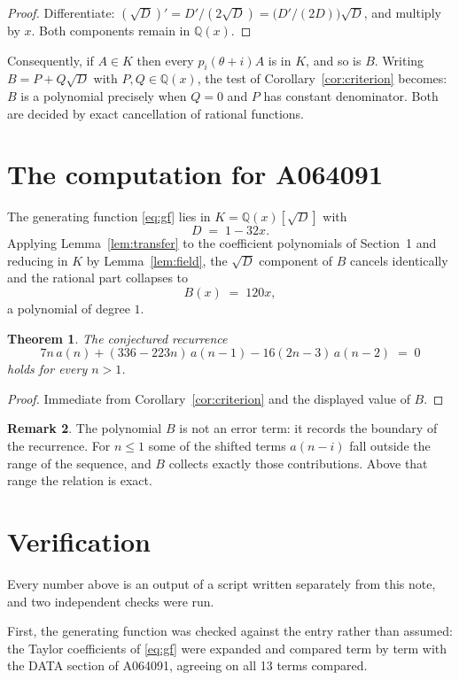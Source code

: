\documentclass[11pt,a4paper]{article}
\theoremstyle{plain}
\newtheorem{theorem}{Theorem}
\theoremstyle{definition}
\newtheorem{remark}[theorem]{Remark}
\begin{document}
\begin{proof}
Differentiate: $(\sqrt{D})'=D'/(2\sqrt{D})=\bigl(D'/(2D)\bigr)\sqrt{D}$, and multiply by
$x$. Both components remain in $\mathbb{Q}(x)$.
\end{proof}

Consequently, if $A\in K$ then every $p_{i}(\theta+i)A$ is in $K$, and so is $B$. Writing
$B=P+Q\sqrt{D}$ with $P,Q\in\mathbb{Q}(x)$, the test of Corollary~\ref{cor:criterion}
becomes: $B$ is a polynomial precisely when $Q=0$ and $P$ has constant denominator. Both
are decided by exact cancellation of rational functions.

\section{The computation for A064091}

The generating function \eqref{eq:gf} lies in $K=\mathbb{Q}(x)[\sqrt{D}]$ with
\[
D \;=\; 1 - 32 x .
\]
Applying Lemma~\ref{lem:transfer} to the coefficient polynomials of Section~1 and reducing
in $K$ by Lemma~\ref{lem:field}, the $\sqrt{D}$ component of $B$ cancels identically and
the rational part collapses to
\[
B(x)\;=\;120 x ,
\]
a polynomial of degree $1$.

\begin{theorem}
The conjectured recurrence
\[
7 n\,a(n) + (336 - 223 n)\,a(n-1) -  16 \left(2 n - 3\right)\,a(n-2) \;=\;0
\]
holds for every $n>1$.
\end{theorem}

\begin{proof}
Immediate from Corollary~\ref{cor:criterion} and the displayed value of $B$.
\end{proof}

\begin{remark}
The polynomial $B$ is not an error term: it records the boundary of the recurrence. For
$n\le1$ some of the shifted terms $a(n-i)$ fall outside the range of the sequence,
and $B$ collects exactly those contributions. Above that range the relation is exact.
\end{remark}

\section{Verification}

Every number above is an output of a script written separately from this note, and two
independent checks were run.

First, the generating function was checked against the entry rather than assumed: the
Taylor coefficients of \eqref{eq:gf} were expanded and compared term by term with the DATA
section of A064091, agreeing on all 13 terms compared.
\end{document}
